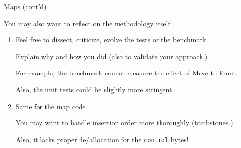 \begin{frame}[fragile]{Maps (cont'd)}

  You may also want to reflect on the methodology itself:
  
  \begin{enumerate}
  \item Feel free to dissect, criticize, evolve the tests or the benchmark

    Explain why and how you did (also to validate your approach.)

    For example, the benchmark cannot measure the effect of Move-to-Front.

    Also, the unit tests could be slightly more stringent. 

  \item Same for the map code

    You may want to handle insertion order more thoroughly (tombstones.)

    Also, it lacks proper de/allocation for the \lstinline{control} bytes!

  \end{enumerate}

\end{frame}


